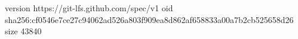 version https://git-lfs.github.com/spec/v1
oid sha256:cf0546e7ce27c94062ad526a803f909ea8d862af658833a00a7b2cb525658d26
size 43840
